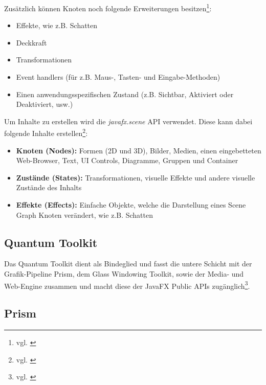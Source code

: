 Zusätzlich können Knoten noch folgende Erweiterungen besitzen\footnote{vgl. \cite{javafxarchitecture}}:

\begin{itemize}
	\item Effekte, wie z.B. Schatten
	\item Deckkraft
	\item Transformationen
	\item Event handlers (für z.B. Maus-, Tasten- und Eingabe-Methoden)
	\item Einen anwendungsspezifischen Zustand (z.B. Sichtbar, Aktiviert oder Deaktiviert, usw.)
\end{itemize}

Um Inhalte zu erstellen wird die \textit{javafx.scene} API verwendet. Diese kann dabei folgende Inhalte erstellen\footnote{vgl. \cite{javafxarchitecture}}:

\begin{itemize}
	\item \textbf{Knoten (Nodes):} Formen (2D und 3D), Bilder, Medien, einen eingebetteten Web-Browser, Text, UI Controls, Diagramme, Gruppen und Container
	\item \textbf{Zustände (States):} Transformationen, visuelle Effekte und andere visuelle Zustände des Inhalts
	\item \textbf{Effekte (Effects):} Einfache Objekte, welche die Darstellung eines Scene Graph Knoten verändert, wie z.B. Schatten
\end{itemize}


\subsection{Quantum Toolkit}

Das Quantum Toolkit dient als Bindeglied und fasst die untere Schicht mit der Grafik-Pipeline Prism, dem Glass Windowing Toolkit, sowie der Media- und Web-Engine zusammen und macht diese der JavaFX Public APIs zugänglich\footnote{vgl. \cite{einfuehrungInJavaFX}}.


\subsection{Prism}

